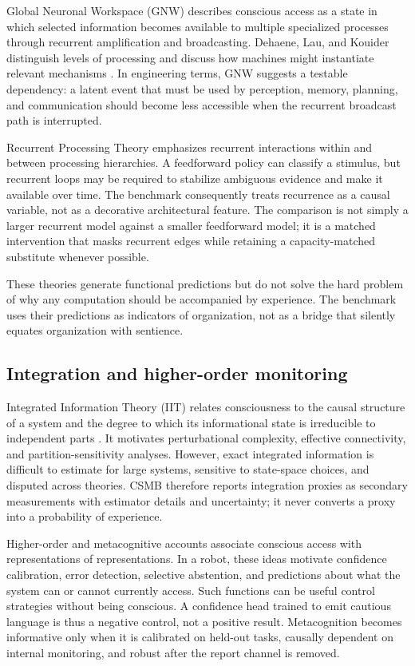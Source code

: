 \documentclass[conference]{IEEEtran}
\begin{document}
Global Neuronal Workspace (GNW) describes conscious access as a state in which selected information becomes available to multiple specialized processes through recurrent amplification and broadcasting. Dehaene, Lau, and Kouider distinguish levels of processing and discuss how machines might instantiate relevant mechanisms \cite{dehaene2017}. In engineering terms, GNW suggests a testable dependency: a latent event that must be used by perception, memory, planning, and communication should become less accessible when the recurrent broadcast path is interrupted.

Recurrent Processing Theory emphasizes recurrent interactions within and between processing hierarchies. A feedforward policy can classify a stimulus, but recurrent loops may be required to stabilize ambiguous evidence and make it available over time. The benchmark consequently treats recurrence as a causal variable, not as a decorative architectural feature. The comparison is not simply a larger recurrent model against a smaller feedforward model; it is a matched intervention that masks recurrent edges while retaining a capacity-matched substitute whenever possible.

These theories generate functional predictions but do not solve the hard problem of why any computation should be accompanied by experience. The benchmark uses their predictions as indicators of organization, not as a bridge that silently equates organization with sentience.

\subsection{Integration and higher-order monitoring}

Integrated Information Theory (IIT) relates consciousness to the causal structure of a system and the degree to which its informational state is irreducible to independent parts \cite{tononi2016}. It motivates perturbational complexity, effective connectivity, and partition-sensitivity analyses. However, exact integrated information is difficult to estimate for large systems, sensitive to state-space choices, and disputed across theories. CSMB therefore reports integration proxies as secondary measurements with estimator details and uncertainty; it never converts a proxy into a probability of experience.

Higher-order and metacognitive accounts associate conscious access with representations of representations. In a robot, these ideas motivate confidence calibration, error detection, selective abstention, and predictions about what the system can or cannot currently access. Such functions can be useful control strategies without being conscious. A confidence head trained to emit cautious language is thus a negative control, not a positive result. Metacognition becomes informative only when it is calibrated on held-out tasks, causally dependent on internal monitoring, and robust after the report channel is removed.
\end{document}
